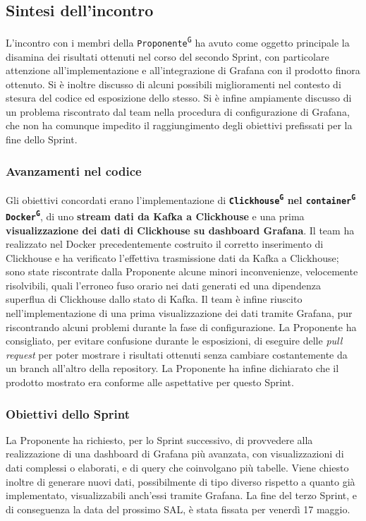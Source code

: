 \documentclass[8pt]{article}
\newcommand{\glossterm}[1]{#1\textsuperscript{G}} %
\begin{document}
\subsection{Sintesi dell'incontro}
L'incontro con i membri della \texttt{\glossterm{Proponente}} ha avuto come oggetto principale la disamina dei risultati ottenuti nel corso del secondo Sprint, con particolare attenzione all'implementazione e all'integrazione di Grafana con il prodotto finora ottenuto. Si è inoltre discusso di alcuni possibili miglioramenti nel contesto di stesura del codice ed esposizione dello stesso. Si è infine ampiamente discusso di un problema riscontrato dal team nella procedura di configurazione di Grafana, che non ha comunque impedito il raggiungimento degli obiettivi prefissati per la fine dello Sprint.

\subsubsection{Avanzamenti nel codice}
Gli obiettivi concordati erano l'implementazione di \textbf{\texttt{\glossterm{Clickhouse}} nel \texttt{\glossterm{container}} \texttt{\glossterm{Docker}}}, di uno \textbf{stream dati da Kafka a Clickhouse} e una prima \textbf{visualizzazione dei dati di Clickhouse su dashboard Grafana}. Il team ha realizzato nel Docker precedentemente costruito il corretto inserimento di Clickhouse e ha verificato l'effettiva trasmissione dati da Kafka a Clickhouse; sono state riscontrate dalla Proponente alcune minori inconvenienze, velocemente risolvibili, quali l'erroneo fuso orario nei dati generati ed una dipendenza superflua di Clickhouse dallo stato di Kafka. Il team è infine riuscito nell'implementazione di una prima visualizzazione dei dati tramite Grafana, pur riscontrando alcuni problemi durante la fase di configurazione. La Proponente ha consigliato, per evitare confusione durante le esposizioni, di eseguire delle \textit{pull request} per poter mostrare i risultati ottenuti senza cambiare costantemente da un branch all'altro della repository. La Proponente ha infine dichiarato che il prodotto mostrato era conforme alle aspettative per questo Sprint.

\subsubsection{Obiettivi dello Sprint}
La Proponente ha richiesto, per lo Sprint successivo, di provvedere alla realizzazione di una dashboard di Grafana più avanzata, con visualizzazioni di dati complessi o elaborati, e di query che coinvolgano più tabelle. Viene chiesto inoltre di generare nuovi dati, possibilmente di tipo diverso rispetto a quanto già implementato, visualizzabili anch'essi tramite Grafana. La fine del terzo Sprint, e di conseguenza la data del prossimo SAL, è stata fissata per venerdì 17 maggio. 
\end{document}
